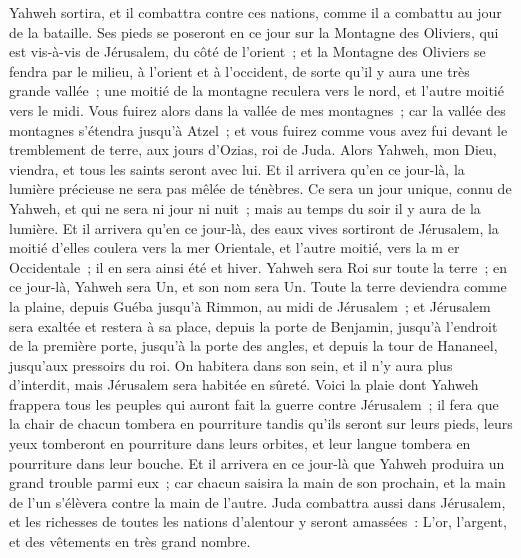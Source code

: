 \begin{multicols}{2}
Yahweh sortira, et il combattra contre ces nations, comme il a combattu au jour de la bataille.
Ses pieds se poseront en ce jour sur la Montagne des Oliviers, qui est vis-à-vis de Jérusalem, du côté de l'orient~; et la Montagne des Oliviers se fendra par le milieu, à l'orient et à l'occident, de sorte qu'il y aura une très grande vallée~; une moitié de la montagne reculera vers le nord, et l'autre moitié vers le midi.
Vous fuirez alors dans la vallée de mes montagnes~; car la vallée des montagnes s'étendra jusqu'à Atzel~; et vous fuirez comme vous avez fui devant le tremblement de terre, aux jours d'Ozias, roi de Juda. Alors Yahweh, mon Dieu, viendra, et tous les saints seront avec lui.
Et il arrivera qu'en ce jour-là, la lumière précieuse ne sera pas mêlée de ténèbres.
Ce sera un jour unique, connu de Yahweh, et qui ne sera ni jour ni nuit~; mais au temps du soir il y aura de la lumière.
Et il arrivera qu'en ce jour-là, des eaux vives sortiront de Jérusalem, la moitié d'elles coulera vers la mer Orientale, et l'autre moitié, vers la m er Occidentale~; il en sera ainsi été et hiver.
Yahweh sera Roi sur toute la terre~; en ce jour-là, Yahweh sera Un, et son nom sera Un.
Toute la terre deviendra comme la plaine, depuis Guéba jusqu'à Rimmon, au midi de Jérusalem~; et Jérusalem sera exaltée et restera à sa place, depuis la porte de Benjamin, jusqu'à l'endroit de la première porte, jusqu'à la porte des angles, et depuis la tour de Hananeel, jusqu'aux pressoirs du roi.
On habitera dans son sein, et il n'y aura plus d'interdit, mais Jérusalem sera habitée en sûreté.
Voici la plaie dont Yahweh frappera tous les peuples qui auront fait la guerre contre Jérusalem~; il fera que la chair de chacun tombera en pourriture tandis qu'ils seront sur leurs pieds, leurs yeux tomberont en pourriture dans leurs orbites, et leur langue tombera en pourriture dans leur bouche.
Et il arrivera en ce jour-là que Yahweh produira un grand trouble parmi eux~; car chacun saisira la main de son prochain, et la main de l'un s'élèvera contre la main de l'autre.
Juda combattra aussi dans Jérusalem, et les richesses de toutes les nations d'alentour y seront amassées~: L'or, l'argent, et des vêtements en très grand nombre.

\end{multicols}
